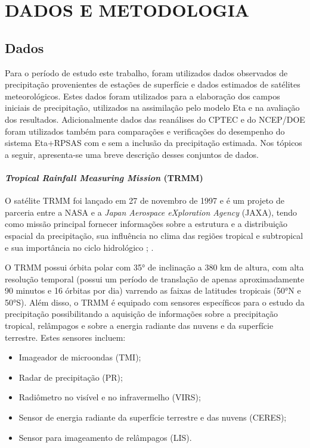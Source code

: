 \hypertarget{estilo:capitulo}{}
\chapter{DADOS E METODOLOGIA}
\label{ss:cap2}

\section{Dados}
\label{ss:dados}
    
Para o período de estudo este trabalho, foram utilizados dados observados de precipitação provenientes de estações de superfície e dados estimados de satélites meteorológicos. Estes dados foram utilizados para a elaboração dos campos iniciais de precipitação, utilizados na assimilação pelo modelo Eta e na avaliação dos resultados. Adicionalmente dados das reanálises do CPTEC e do NCEP/DOE foram utilizados também para comparações e verificações do desempenho do sistema Eta+RPSAS com e sem a inclusão da precipitação estimada. Nos tópicos a seguir, apresenta-se uma breve descrição desses conjuntos de dados.

\subsubsection{\textit{Tropical Rainfall Measuring Mission} (TRMM)}

O satélite TRMM foi lançado em 27 de novembro de 1997 e é um projeto de parceria entre a NASA e a \textit{Japan Aerospace eXploration Agency} (JAXA), tendo como missão principal  fornecer informações sobre a estrutura e a distribuição espacial da precipitação, sua influência no clima das regiões tropical e subtropical e sua importância no ciclo hidrológico \cite{simpsonetal88}; \cite{simpsonetal96}.

O TRMM possui órbita polar com 35° de inclinação a 380 km de altura, com alta resolução temporal (possui um período de translação de apenas aproximadamente 90 minutos e 16 órbitas por dia) varrendo as faixas de latitudes tropicais (50°N e 50°S). Além disso, o TRMM é equipado com sensores específicos para o estudo da precipitação possibilitando a aquisição de informações sobre a precipitação tropical, relâmpagos e sobre a energia radiante das nuvens e da superfície terrestre. Estes sensores incluem:

\begin{itemize}
\item Imageador de microondas (TMI);
\item Radar de precipitação (PR);
\item Radiômetro no visível e no infravermelho (VIRS);
\item Sensor de energia radiante da superfície terrestre e das nuvens (CERES);
\item Sensor para imageamento de relâmpagos (LIS).
\end{itemize}

